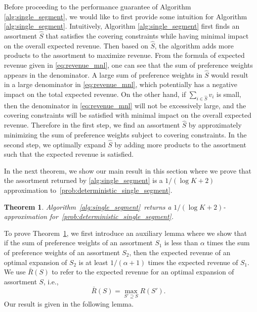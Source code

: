 \documentclass[msom,non-blindrev]{informs3} %
\newtheorem{theorem}{Theorem}
\theoremstyle{definition}
\begin{document}
{  Before proceeding to the performance guarantee of Algorithm \ref{alg:single_segment}, we would like to first provide some intuition for Algorithm \ref{alg:single_segment}. Intuitively, Algorithm \ref{alg:single_segment} first finds an assortment $\hat{S}$ that satisfies the covering constraints while having minimal impact on the overall expected revenue. Then based on $\hat{S}$, the algorithm adds more products to the assortment to maximize revenue. From the formula of expected revenue given in \eqref{eq:revenue_mnl}, one can see that the sum of preference weights appears in the denominator. A large sum of preference weights in $\hat{S}$ would result in a large denominator in \eqref{eq:revenue_mnl}, which potentially has a negative impact on the total expected revenue. On the other hand, if $\sum_{i\in\hat{S}}v_i$ is small, then the denominator in \eqref{eq:revenue_mnl} will not be excessively large, and the covering constraints will be satisfied with minimal impact on the overall expected revenue. Therefore in the first step, we find an assortment $\hat{S}$ by approximately minimizing the sum of preference weights subject to covering constraints. In the second step, we optimally expand $\hat{S}$ by adding more products to the assortment such that the expected revenue is satisfied.}

In the next theorem, we show our main result in this section where  we prove that the assortment returned by \cref{alg:single_segment} is a $1/(\log K+2)$ approximation to~\eqref{prob:deterministic_single_segment}. %

\begin{theorem}\label{thm:single_segment}
Algorithm~\ref{alg:single_segment}~returns a $1/(\log K+2)$-approximation for~\eqref{prob:deterministic_single_segment}.
\end{theorem}

To prove Theorem~\ref{thm:single_segment}, we first introduce an auxiliary lemma where we show  that if the sum of preference weights of an assortment $S_1$ is less than  $\alpha$ times the sum of preference weights of an assortment $S_2$, then the expected revenue of an optimal expansion of $S_2$ is at least $1/(\alpha+1)$ times the expected revenue of $S_1$. 
We use $\bar{R}(S)$ to refer to the expected revenue for an optimal expansion of assortment $S$, i.e., 
$$\bar{R}(S)=\max_{S'\supseteq S}R(S').$$
Our result is given in the following lemma. %
\end{document}
